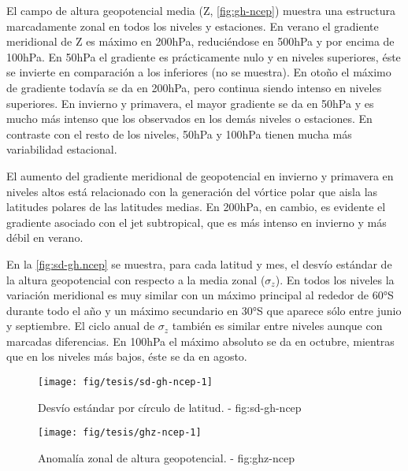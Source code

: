 \documentclass[spanish,a4paper]{book}
\begin{document}
El campo de altura geopotencial media (Z, \autoref{fig:gh-ncep}) muestra
una estructura marcadamente zonal en todos los niveles y estaciones. En
verano el gradiente meridional de Z es máximo en 200hPa, reduciéndose en
500hPa y por encima de 100hPa. En 50hPa el gradiente es prácticamente
nulo y en niveles superiores, éste se invierte en comparación a los
inferiores (no se muestra). En otoño el máximo de gradiente todavía se
da en 200hPa, pero continua siendo intenso en niveles superiores. En
invierno y primavera, el mayor gradiente se da en 50hPa y es mucho más
intenso que los observados en los demás niveles o estaciones. En
contraste con el resto de los niveles, 50hPa y 100hPa tienen mucha más
variabilidad estacional.

El aumento del gradiente meridional de geopotencial en invierno y
primavera en niveles altos está relacionado con la generación del
vórtice polar que aisla las latitudes polares de las
latitudes medias. En 200hPa, en cambio, es evidente el gradiente
asociado con el jet subtropical, que es más intenso en invierno y más
débil en verano.

En la \autoref{fig:sd-gh.ncep} se muestra, para cada latitud y mes, el
desvío estándar de la altura geopotencial con respecto a la media zonal
(\(\sigma_z\)). En todos los niveles la variación meridional es muy
similar con un máximo principal al rededor de 60°S durante todo el año y
un máximo secundario en 30°S que aparece sólo entre junio y septiembre.
El ciclo anual de \(\sigma_z\) también es similar entre niveles aunque
con marcadas diferencias. En 100hPa el máximo absoluto se da en octubre,
mientras que en los niveles más bajos, éste se da en agosto.

\begin{figure}

{\centering \texttt{[image: fig/tesis/sd-gh-ncep-1]} 

}

\caption{Desvío estándar por círculo de latitud. - fig:sd-gh-ncep}\label{fig:sd-gh-ncep}
\end{figure}

\begin{landscape}\begin{figure}

{\centering \texttt{[image: fig/tesis/ghz-ncep-1]} 

}

\caption{Anomalía zonal de altura geopotencial. - fig:ghz-ncep}\label{fig:ghz-ncep}
\end{figure}
\end{landscape}
\end{document}
